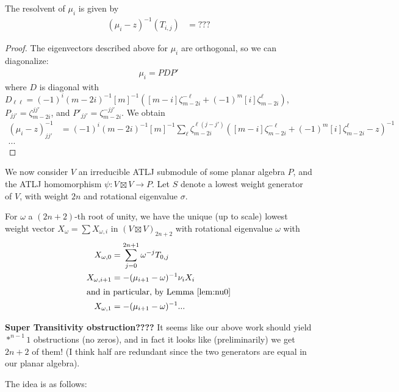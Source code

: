 \documentclass[12pt]{article}
\begin{document}
\begin{lem}
The resolvent of $\mu_i$ is given by
\begin{align*}
(\mu_i - z)^{-1}(T_{i,j}) & = ???
\end{align*}
\end{lem}
\begin{proof}
The eigenvectors described above for $\mu_i$ are orthogonal, so we can diagonalize:
\begin{align*}
\mu_i = P D P'
\end{align*}
where $D$ is diagonal with 
$D_{\ell\ell} = (-1)^i(m-2i)^{-1}[m]^{-1} \left([m-i] \zeta_{m-2i}^{-\ell} + (-1)^{m}[i] \zeta_{m-2i}^\ell\right)$, 
$P_{jj'} = \zeta_{m-2i}^{jj'}$, and 
$P'_{jj'} = \zeta_{m-2i}^{-jj'}$.
We obtain
\begin{align*}
(\mu_i - z)^{-1}_{jj'} & = (-1)^i(m-2i)^{-1}[m]^{-1} \sum_{\ell} \zeta_{m-2i}^{\ell(j-j')}  \left([m-i] \zeta_{m-2i}^{-\ell} + (-1)^{m}[i] \zeta_{m-2i}^\ell - z\right)^{-1} \\
...
\end{align*}
\end{proof}

We now consider $V$ an irreducible ATLJ submodule of some planar algebra $P$, and the ATLJ homomorphism $\psi: V\boxtimes V\rightarrow P$. Let $S$ denote a lowest weight generator of $V$, with weight $2n$ and rotational eigenvalue $\sigma$.

For $\omega$ a $(2n+2)$-th root of unity, we have the unique (up to scale) lowest weight vector $X_\omega = \sum X_{\omega,i}$ in $(V \boxtimes V)_{2n+2}$ with rotational eigenvalue $\omega$ with
\begin{align*}
X_{\omega,0} & = \sum_{j=0}^{2n+1} \omega^{-j} T_{0,j} \\
X_{\omega,i+1} & = - (\mu_{i+1} - \omega)^{-1} \nu_i X_i \\
\intertext{and in particular, by Lemma \ref{lem:nu0}}
X_{\omega,1} & = - (\mu_{i+1} - \omega)^{-1}  ...
\end{align*}

\textbf{Super Transitivity obstruction????} It seems like our above work should yield $*^{n-1}1$ obstructions (no zeros), and in fact it looks like (preliminarily) we get $2n+2$ of them! (I think half are redundant since the two generators are equal in our planar algebra).

The idea is as follows:
\end{document}
